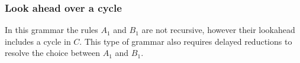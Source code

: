 \documentclass[envcountsame,runningheads]{llncs}
\begin{document}
%
%




\subsubsection{Look ahead over a cycle}
In this grammar the rules $A_1$ and $B_1$ are not recursive, however their lookahead includes a cycle in $C$. 
This type of grammar also requires delayed reductions to resolve the choice between $A_1$ and $B_1$.
\end{document}
